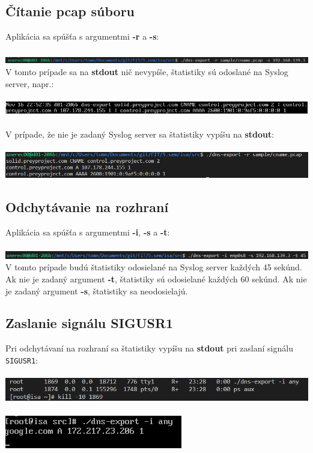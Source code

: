\documentclass{article}
\begin{document}
        \subsection{Čítanie pcap súboru}
        \noindent
        Aplikácia sa spúšťa s argumentmi \textbf{-r} a \textbf{-s}:\\\\
        \includegraphics[scale=0.6]{r1.png}
        V tomto prípade sa na \textbf{stdout} nič nevypíše, štatistiky sú odoslané na Syslog server, napr.:\\\\
        \includegraphics[scale=0.6]{r2.png}\\\\
        V prípade, že nie je zadaný Syslog server sa štatistiky vypíšu na \textbf{stdout}:\\\\
        \includegraphics[scale=0.6]{r3.png}

        \subsection{Odchytávanie na rozhraní}
        \noindent
        Aplikácia sa spúšťa s argumentmi \textbf{-i}, \textbf{-s} a \textbf{-t}:\\\\
        \includegraphics[scale=0.6]{i1.png}
        V tomto prípade budú štatistiky odosielané na Syslog server každých 45 sekúnd. Ak nie je zadaný argument \textbf{-t},
        štatistiky sú odosielané každých 60 sekúnd. Ak nie je zadaný argument \textbf{-s}, štatistiky sa neodosielajú.

        \subsection{Zaslanie signálu SIGUSR1}
        \noindent
        Pri odchytávaní na rozhraní sa štatistiky vypíšu na \textbf{stdout} pri zaslaní signálu \texttt{SIGUSR1}:\\\\
        \includegraphics[scale=0.6]{i2.png}\\\\
        \includegraphics[scale=0.6]{i3.png}
    
\end{document}
